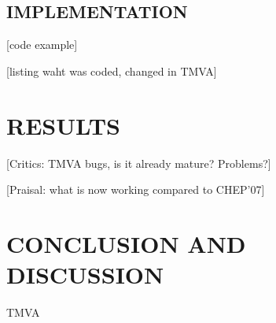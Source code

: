 \documentclass[twoside,floatfix,a4wide]{revtex4}
\begin{document}
\subsection{IMPLEMENTATION \label{section:implementation}}
[code example]

[listing waht was coded, changed in TMVA]

\section{RESULTS} \label{sec:example}









[Critics: TMVA bugs, is it already mature? Problems?]

[Praisal: what is now working compared to CHEP'07]

\section{CONCLUSION AND DISCUSSION} \label{sec:conclusion}
TMVA



\end{document}
